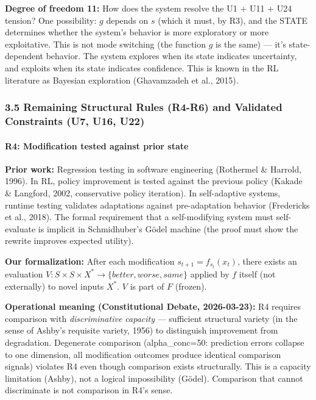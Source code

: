 \documentclass[
  11pt,
]{article}
\begin{document}
\textbf{Degree of freedom 11:} How does the system resolve the U1 + U11
+ U24 tension? One possibility: \(g\) depends on \(s\) (which it must,
by R3), and the STATE determines whether the system's behavior is more
exploratory or more exploitative. This is not mode switching (the
function \(g\) is the same) --- it's state-dependent behavior. The
system explores when its state indicates uncertainty, and exploits when
its state indicates confidence. This is known in the RL literature as
Bayesian exploration (Ghavamzadeh et al., 2015).

\subsubsection{3.5 Remaining Structural Rules (R4-R6) and Validated
Constraints (U7, U16,
U22)}\label{remaining-structural-rules-r4-r6-and-validated-constraints-u7-u16-u22}

\paragraph{R4: Modification tested against prior
state}\label{r4-modification-tested-against-prior-state}

\textbf{Prior work:} Regression testing in software engineering
(Rothermel \& Harrold, 1996). In RL, policy improvement is tested
against the previous policy (Kakade \& Langford, 2002, conservative
policy iteration). In self-adaptive systems, runtime testing validates
adaptations against pre-adaptation behavior (Fredericks et al., 2018).
The formal requirement that a self-modifying system must self-evaluate
is implicit in Schmidhuber's Gödel machine (the proof must show the
rewrite improves expected utility).

\textbf{Our formalization:} After each modification
\(s_{t+1} = f_{s_t}(x_t)\), there exists an evaluation
\(V: S \times S \times X^* \to \{better, worse, same\}\) applied by
\(f\) itself (not externally) to novel inputs \(X^*\). \(V\) is part of
\(F\) (frozen).

\textbf{Operational meaning (Constitutional Debate, 2026-03-23):} R4
requires comparison with \emph{discriminative capacity} --- sufficient
structural variety (in the sense of Ashby's requisite variety, 1956) to
distinguish improvement from degradation. Degenerate comparison
(alpha\_conc=50: prediction errors collapse to one dimension, all
modification outcomes produce identical comparison signals) violates R4
even though comparison exists structurally. This is a capacity
limitation (Ashby), not a logical impossibility (Gödel). Comparison that
cannot discriminate is not comparison in R4's sense.
\end{document}
